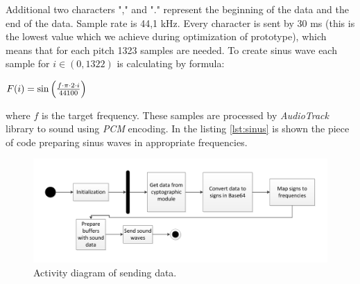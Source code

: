 \documentclass[11pt,titlepage]{article}
\theoremstyle{plain}
\begin{document}
Additional two characters "," and "." represent the beginning of the data and the end of the data. Sample rate is 44,1 kHz. Every character is sent by 30 ms (this is the lowest value which we achieve during optimization of prototype), which means that for each pitch 1323 samples are needed. To create sinus wave each sample for $ i \in (0,1322) $ is calculating by formula:
\begin{center}
$F(i) = \sin\left( f \cdot \pi \cdot 2 \cdot i  \over 44 100  \right)$
\end{center}
where $f$ is the target frequency.
These samples are processed by \textit{AudioTrack} library to sound using \textit{PCM} encoding. In the listing \ref{lst:sinus} is shown the piece of code preparing sinus waves in appropriate frequencies.

\begin{figure}[H]
	\centering
	\includegraphics[width=1\textwidth]{img/Sending_data_active_diag.pdf}
	\caption{Activity diagram of sending data.}
	\label{fig:F21}
\end{figure}
\end{document}
